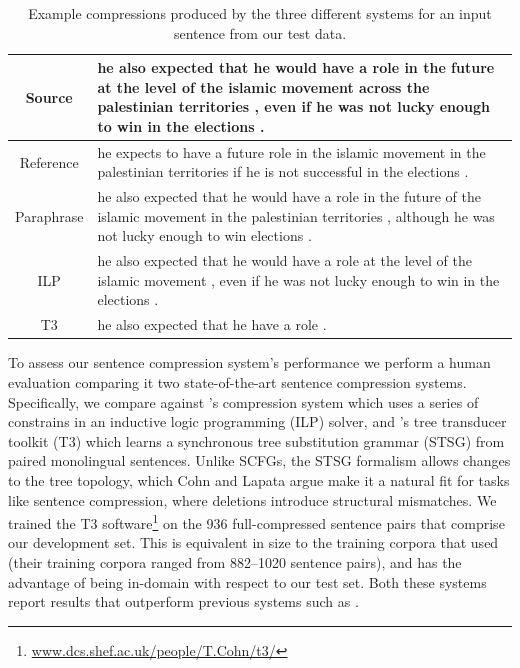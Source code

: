 \documentclass[11pt]{article}
\begin{document}
\begin{table}
\begin{center}
\small
\begin{tabular}{|c|p{13.2cm}|}
  \hline
  Source & he also expected that he would have a role in the future at
  the level of the islamic movement across the palestinian territories
  , even if he was not lucky enough to win in the elections . \\
  \hline
  Reference & he expects to have a future role in the islamic movement
  in the palestinian territories if he is not successful in the
  elections . \\
  \hline
  Paraphrase & he also expected that he would have a role in the future
  of the islamic movement in the palestinian territories , although he
  was not lucky enough to win elections . \\
  \hline
  ILP & he also expected that he would have a role at the level of the
  islamic movement , even if he was not lucky enough to win in the
  elections . \\
  \hline
  T3 & he also expected that he have a role . \\
  \hline
\end{tabular}
\normalsize
\end{center}
\caption{Example compressions produced by the three different systems
  for an input sentence from our test data.}
\label{test_examples}
\end{table}

To assess our sentence compression system's performance we perform a
human evaluation comparing it two state-of-the-art sentence
compression systems.  Specifically, we compare against
's compression system which uses a series of
constrains in an inductive logic programming (ILP) solver, and
's tree transducer toolkit (T3) which learns a
synchronous tree substitution grammar (STSG) from paired monolingual
sentences.  Unlike SCFGs, the STSG formalism allows changes to the
tree topology, which Cohn and Lapata argue make it a natural fit for
tasks like sentence compression, where deletions introduce structural
mismatches.  We trained the T3
software\footnote{\url{www.dcs.shef.ac.uk/people/T.Cohn/t3/}} on the
936 full-compressed sentence pairs that comprise our development set.
This is equivalent in size to the training corpora that
 used (their training corpora ranged from 882--1020
sentence pairs), and has the advantage of being in-domain with respect
to our test set.  Both these systems report results that outperform
previous systems such as .
\end{document}

